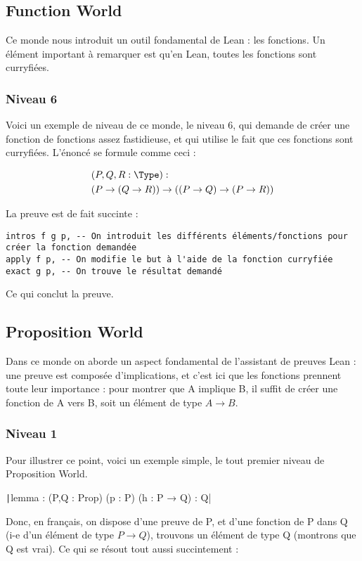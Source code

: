 
\subsection{Function World}
Ce monde nous introduit un outil fondamental de Lean : les fonctions. 
Un élément important à remarquer est qu'en Lean, toutes les fonctions sont curryfiées.


\subsubsection{Niveau 6}
Voici un exemple de niveau de ce monde, le niveau 6, qui demande de créer une fonction de fonctions assez fastidieuse, et qui utilise le fait que ces fonctions sont curryfiées. 
L'énoncé se formule comme ceci : 

\begin{align*}
        & (P, Q, R : \Type) : \\ & (P \to (Q \to R)) \to ((P \to Q) \to (P \to R))
\end{align*}

La preuve est de fait succinte : 
\begin{verbatim}
intros f g p, -- On introduit les différents éléments/fonctions pour créer la fonction demandée 
apply f p, -- On modifie le but à l'aide de la fonction curryfiée 
exact g p, -- On trouve le résultat demandé 
\end{verbatim}
Ce qui conclut la preuve.

\subsection{Proposition World}
Dans ce monde on aborde un aspect fondamental de l'assistant de preuves Lean : une preuve est composée d'implications, et c'est ici que les fonctions prennent toute leur importance : pour montrer que A implique B, il suffit de créer une fonction de A vers B, soit un élément de type $A \to B$.
\subsubsection{Niveau 1}
Pour illustrer ce point, voici un exemple simple, le tout premier niveau de Proposition World. 

\texttt|lemma : (P,Q : Prop) (p : P) (h : P → Q) : Q|

Donc, en français, on dispose d'une preuve de P, et d'une fonction de P dans Q (i-e d'un élément de type $P \to Q$), trouvons un élément de type Q (montrons que Q est vrai). 
Ce qui se résout tout aussi succintement : 

